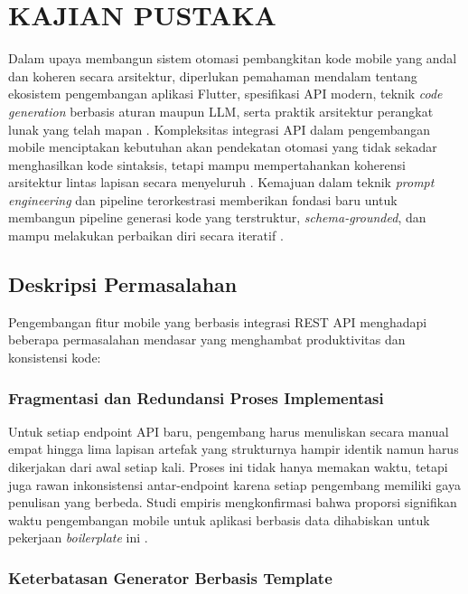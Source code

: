 \chapter{KAJIAN PUSTAKA}

Dalam upaya membangun sistem otomasi pembangkitan kode mobile yang andal dan koheren secara arsitektur, diperlukan pemahaman mendalam tentang ekosistem pengembangan aplikasi Flutter, spesifikasi API modern, teknik \textit{code generation} berbasis aturan maupun LLM, serta praktik arsitektur perangkat lunak yang telah mapan \cite{baneas2021,lamothe2021}. Kompleksitas integrasi API dalam pengembangan mobile menciptakan kebutuhan akan pendekatan otomasi yang tidak sekadar menghasilkan kode sintaksis, tetapi mampu mempertahankan koherensi arsitektur lintas lapisan secara menyeluruh \cite{zhang2021}. Kemajuan dalam teknik \textit{prompt engineering} dan pipeline terorkestrasi memberikan fondasi baru untuk membangun pipeline generasi kode yang terstruktur, \textit{schema-grounded}, dan mampu melakukan perbaikan diri secara iteratif \cite{he2025,besta2025}.

\section{Deskripsi Permasalahan}

Pengembangan fitur mobile yang berbasis integrasi REST API menghadapi beberapa permasalahan mendasar yang menghambat produktivitas dan konsistensi kode:

\subsection{Fragmentasi dan Redundansi Proses Implementasi}

Untuk setiap endpoint API baru, pengembang harus menuliskan secara manual empat hingga lima lapisan artefak yang strukturnya hampir identik namun harus dikerjakan dari awal setiap kali. Proses ini tidak hanya memakan waktu, tetapi juga rawan inkonsistensi antar-endpoint karena setiap pengembang memiliki gaya penulisan yang berbeda. Studi empiris mengkonfirmasi bahwa proporsi signifikan waktu pengembangan mobile untuk aplikasi berbasis data dihabiskan untuk pekerjaan \textit{boilerplate} ini \cite{khalfaoui2025}.

\subsection{Keterbatasan Generator Berbasis Template}

